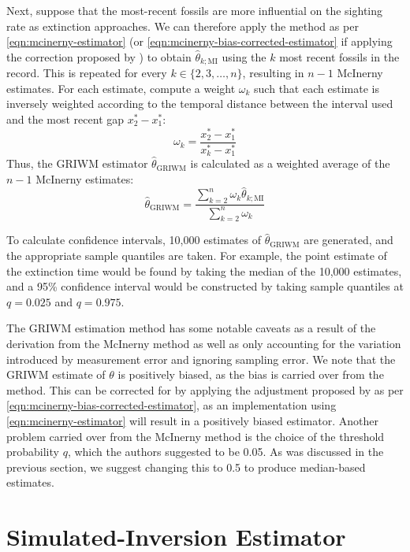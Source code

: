 Next, suppose that the most-recent fossils are more influential on the sighting rate as extinction approaches. We can therefore apply the \citet{Mcinerny2006} method as per \autoref{eqn:mcinerny-estimator} (or \autoref{eqn:mcinerny-bias-corrected-estimator} if applying the correction proposed by \citet{Huang2019}) to obtain $\hat\theta_{k; \text{MI}}$ using the $k$ most recent fossils in the record. This is repeated for every $k \in \{2, 3, \dots, n\}$, resulting in $n-1$ McInerny estimates. For each estimate, compute a weight $\omega_k$ such that each estimate is inversely weighted according to the temporal distance between the interval used and the most recent gap $x^*_{2} - x^*_{1}$: \[
\omega_k = \frac{x^*_{2} - x^*_{1}}{x^*_{k} - x^*_{1}}
\]
Thus, the GRIWM estimator $\hat\theta_{\text{GRIWM}}$ is calculated as a weighted average of the $n-1$ McInerny estimates:\begin{equation}\label{eq:griwm1}
    \hat\theta_{\text{GRIWM}} = \frac{\sum_{k=2}^{n} \omega_k \hat\theta_{k; \text{MI}}}{\sum_{k=2}^{n} \omega_k}
\end{equation}

To calculate confidence intervals, 10{\small,}000 estimates of $\hat\theta_{\text{GRIWM}}$ are generated, and the appropriate sample quantiles are taken. For example, the point estimate of the extinction time would be found by taking the median of the 10{\small,}000 estimates, and a 95\% confidence interval would be constructed by taking sample quantiles at $q=0.025$ and $q=0.975$.

The GRIWM estimation method has some notable caveats as a result of the derivation from the McInerny method as well as only accounting for the variation introduced by measurement error and ignoring sampling error. We note that the GRIWM estimate of $\theta$ is positively biased, as the bias is carried over from the \citet{Mcinerny2006} method. This can be corrected for by applying the adjustment proposed by \citet{Huang2019} as per \autoref{eqn:mcinerny-bias-corrected-estimator}, as an implementation using \autoref{eqn:mcinerny-estimator} will result in a positively biased estimator. Another problem carried over from the McInerny method is the choice of the threshold probability $q$, which the authors suggested to be 0.05. As was discussed in the previous section, we suggest changing this to 0.5 to produce median-based estimates.

\section{Simulated-Inversion Estimator}

